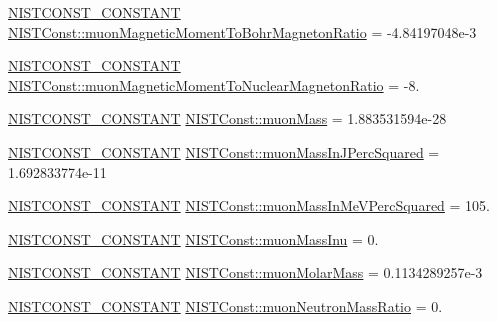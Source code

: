 \begin{DoxyCompactItemize}
\mbox{\hyperlink{group___n_i_s_t_const-_macros_ga2b0fc1d7452373f816175dd86ce26729}{N\+I\+S\+T\+C\+O\+N\+S\+T\+\_\+\+C\+O\+N\+S\+T\+A\+NT}} \mbox{\hyperlink{group___n_i_s_t_const-_muon_gafdfe57fdba97012c3d70a551cdee5486}{N\+I\+S\+T\+Const\+::muon\+Magnetic\+Moment\+To\+Bohr\+Magneton\+Ratio}} = -\/4.\+84197048e-\/3
\item 
\mbox{\hyperlink{group___n_i_s_t_const-_macros_ga2b0fc1d7452373f816175dd86ce26729}{N\+I\+S\+T\+C\+O\+N\+S\+T\+\_\+\+C\+O\+N\+S\+T\+A\+NT}} \mbox{\hyperlink{group___n_i_s_t_const-_muon_gab10139dee865fa4835ccc9d286d95a54}{N\+I\+S\+T\+Const\+::muon\+Magnetic\+Moment\+To\+Nuclear\+Magneton\+Ratio}} = -\/8.
\item 
\mbox{\hyperlink{group___n_i_s_t_const-_macros_ga2b0fc1d7452373f816175dd86ce26729}{N\+I\+S\+T\+C\+O\+N\+S\+T\+\_\+\+C\+O\+N\+S\+T\+A\+NT}} \mbox{\hyperlink{group___n_i_s_t_const-_muon_ga080664dd3b1c18f9956edb71386b5177}{N\+I\+S\+T\+Const\+::muon\+Mass}} = 1.\+883531594e-\/28
\item 
\mbox{\hyperlink{group___n_i_s_t_const-_macros_ga2b0fc1d7452373f816175dd86ce26729}{N\+I\+S\+T\+C\+O\+N\+S\+T\+\_\+\+C\+O\+N\+S\+T\+A\+NT}} \mbox{\hyperlink{group___n_i_s_t_const-_muon_gad4d3ef88615f2e5317fd48617c0740ce}{N\+I\+S\+T\+Const\+::muon\+Mass\+In\+J\+Perc\+Squared}} = 1.\+692833774e-\/11
\item 
\mbox{\hyperlink{group___n_i_s_t_const-_macros_ga2b0fc1d7452373f816175dd86ce26729}{N\+I\+S\+T\+C\+O\+N\+S\+T\+\_\+\+C\+O\+N\+S\+T\+A\+NT}} \mbox{\hyperlink{group___n_i_s_t_const-_muon_ga1931118dd705cad81b5defc9ecd5563b}{N\+I\+S\+T\+Const\+::muon\+Mass\+In\+Me\+V\+Perc\+Squared}} = 105.
\item 
\mbox{\hyperlink{group___n_i_s_t_const-_macros_ga2b0fc1d7452373f816175dd86ce26729}{N\+I\+S\+T\+C\+O\+N\+S\+T\+\_\+\+C\+O\+N\+S\+T\+A\+NT}} \mbox{\hyperlink{group___n_i_s_t_const-_muon_gabfb491f48425292980506d140a2a98e7}{N\+I\+S\+T\+Const\+::muon\+Mass\+Inu}} = 0.
\item 
\mbox{\hyperlink{group___n_i_s_t_const-_macros_ga2b0fc1d7452373f816175dd86ce26729}{N\+I\+S\+T\+C\+O\+N\+S\+T\+\_\+\+C\+O\+N\+S\+T\+A\+NT}} \mbox{\hyperlink{group___n_i_s_t_const-_muon_ga5954f4ab45a821dc96199dea5629b265}{N\+I\+S\+T\+Const\+::muon\+Molar\+Mass}} = 0.\+1134289257e-\/3
\item 
\mbox{\hyperlink{group___n_i_s_t_const-_macros_ga2b0fc1d7452373f816175dd86ce26729}{N\+I\+S\+T\+C\+O\+N\+S\+T\+\_\+\+C\+O\+N\+S\+T\+A\+NT}} \mbox{\hyperlink{group___n_i_s_t_const-_muon_ga8618e14187f44f64729c26685f42387d}{N\+I\+S\+T\+Const\+::muon\+Neutron\+Mass\+Ratio}} = 0.

\end{DoxyCompactItemize}
